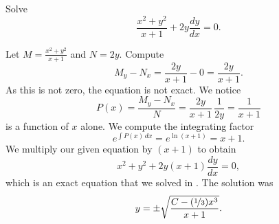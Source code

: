 \begin{example}
Solve
\begin{equation*}
\frac{x^2+y^2}{x+1} + 2y \frac{dy}{dx} = 0 .
\end{equation*}

Let $M= \frac{x^2+y^2}{x+1}$ and $N=2y$.
Compute
\begin{equation*}
M_y-N_x = \frac{2y}{x+1} - 0 = \frac{2y}{x+1} .
\end{equation*}
As this is not zero, the equation is not exact.  We notice 
\begin{equation*}
P(x) = \frac{M_y-N_x}{N} = \frac{2y}{x+1} \, \frac{1}{2y} = \frac{1}{x+1} 
\end{equation*}
is a function of $x$ alone.    We compute the integrating factor
\begin{equation*}
e^{\int  P(x) \, dx}
=
e^{\ln (x+1)} = x+1 .
\end{equation*}
We multiply our given equation by $(x+1)$ to obtain
\begin{equation*}
x^2+y^2 + 2y(x+1) \frac{dy}{dx} = 0 ,
\end{equation*}
which is an exact equation that we solved in
.  The solution was
\begin{equation*}
y = \pm \sqrt{\frac{C-(\nicefrac{1}{3})x^3}{x+1}} .
\end{equation*}
\end{example}

